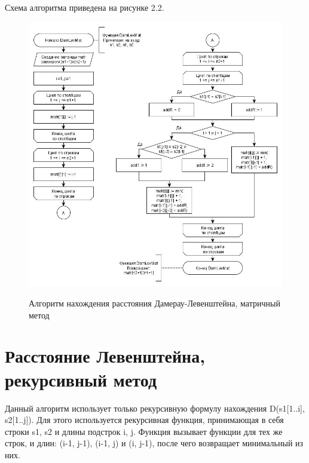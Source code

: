 \documentclass[10pt,a4paper]{report}
\begin{document}
	Схема алгоритма приведена на рисунке 2.2.
	\begin{figure}[h]
		\begin{center}
			{\includegraphics[scale = 0.55]{DamLev_mat}}
			\caption{Алгоритм нахождения расстояния Дамерау-Левенштейна, матричный метод}
		\end{center}
	\end{figure}


	\section{Расстояние Левенштейна, рекурсивный метод}
	Данный алгоритм использует только рекурсивную формулу нахождения D(s1[1..i], s2[1..j]). Для этого используется рекурсивная функция, принимающая в себя строки s1, s2 и длины подстрок i, j. Функция вызывает функции для тех же строк, и длин: (i-1, j-1), (i-1, j) и (i, j-1), после чего возвращает минимальный из них.
	
\end{document}
